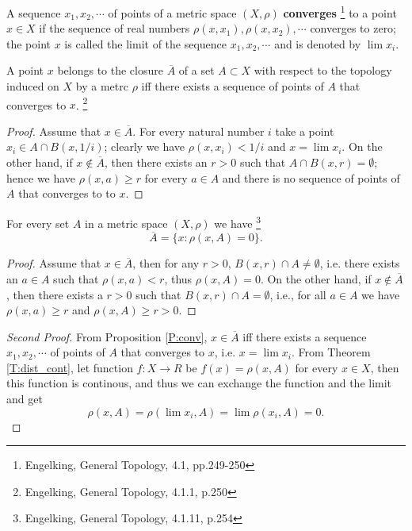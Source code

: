 \begin{definition}
A sequence $x_1,x_2,\cdots$ of points of a metric space $(X,\rho)$
\textbf{converges}
\footnote{Engelking, General Topology, 4.1, pp.249-250}
to a point $x\in X$ if the sequence of real numbers
$\rho(x,x_1),\rho(x,x_2),\cdots$ converges to zero; the point $x$ is called the
limit of the sequence $x_1,x_2,\cdots$ and is denoted by $\lim{x_i}$.
\end{definition}

\begin{proposition} \label{P:conv}
A point $x$ belongs to the closure $\overline{A}$ of a set $A\subset X$ with respect
to the topology induced on $X$ by a metrc $\rho$ iff there exists a sequence of
points of $A$ that converges to $x$.
\footnote{Engelking, General Topology, 4.1.1, p.250}
\end{proposition}
\begin{proof}
Assume that $x\in \overline{A}$. For every natural number $i$ take a point 
$x_i\in A\cap B(x,1/i)$; clearly we have $\rho(x,x_i)<1/i$ and $x=\lim{x_i}$.
On the other hand, if $x\notin \overline{A}$, then there exists an $r>0$ such that
$A\cap B(x,r)=\emptyset$; hence we have $\rho(x,a)\ge r$ for every $a\in A$ and
there is no sequence of points of $A$ that converges to to $x$.
\end{proof}




\begin{corollary} \label{C:closure_m}
For every set $A$ in a metric space $(X,\rho)$ we have
\footnote{Engelking, General Topology, 4.1.11, p.254}
\[
  \overline{A} = \{ x: \rho(x,A)=0  \}.
\]
\end{corollary}
\begin{proof}
Assume that $x\in\overline{A}$, then for any $r>0$, $B(x,r)\cap A\neq\emptyset$, i.e.
there exists an $a\in A$ such that $\rho(x,a)<r$, thus $\rho(x,A)=0$. On the
other hand, if $x\notin \overline{A}$, then there exists a $r>0$ such that
$B(x,r)\cap A=\emptyset$, i.e., for all $a\in A$ we have $\rho(x,a)\ge r$ and
$\rho(x,A)\ge r>0$.
\end{proof}
\begin{proof}[Second Proof]
From Proposition \ref{P:conv}, $x\in \overline{A}$ iff there exists a sequence
$x_1,x_2,\cdots$ of points of $A$ that converges to $x$, i.e. $x=\lim{x_i}$.
From Theorem \ref{T:dist_cont}, let function $f:X\to R$ be 
$f(x)=\rho(x,A)$ for every $x\in X$, then this function is continous,
and thus we can exchange the function and the limit and get
\[
  \rho(x,A)=\rho(\lim{x_i},A)=\lim\rho(x_i,A)=0.
\]
\end{proof}




